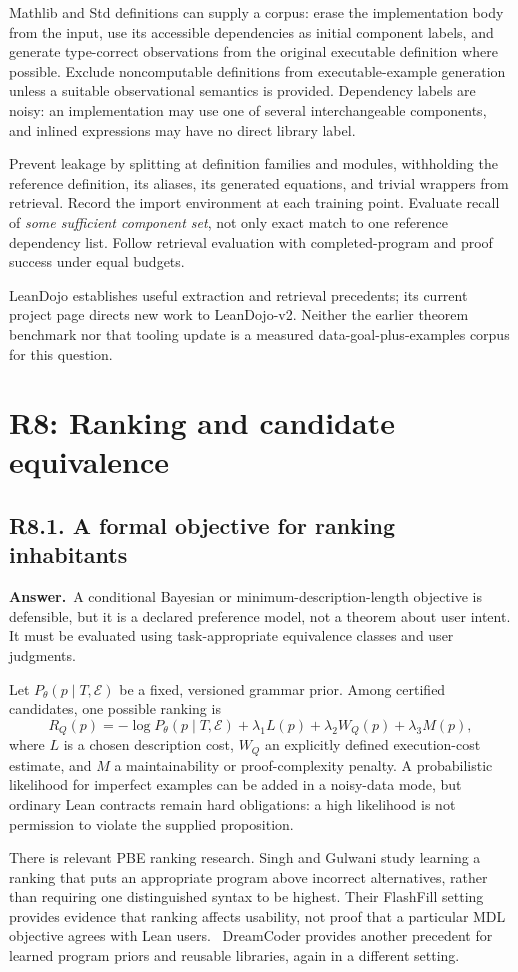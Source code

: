 \documentclass[11pt,a4paper]{article}
\newcommand{\qid}[3]{\subsection{#2. #3}\label{#1}}
\newcommand{\answer}{\noindent\textbf{Answer.}\ }
\theoremstyle{remark}
\begin{document}
Mathlib and Std definitions can supply a corpus: erase the implementation body from the input, use its accessible dependencies as initial component labels, and generate type-correct observations from the original executable definition where possible. Exclude noncomputable definitions from executable-example generation unless a suitable observational semantics is provided. Dependency labels are noisy: an implementation may use one of several interchangeable components, and inlined expressions may have no direct library label.

Prevent leakage by splitting at definition families and modules, withholding the reference definition, its aliases, its generated equations, and trivial wrappers from retrieval. Record the import environment at each training point. Evaluate recall of \emph{some sufficient component set}, not only exact match to one reference dependency list. Follow retrieval evaluation with completed-program and proof success under equal budgets.

LeanDojo establishes useful extraction and retrieval precedents; its current project page directs new work to LeanDojo-v2. Neither the earlier theorem benchmark nor that tooling update is a measured data-goal-plus-examples corpus for this question.~\cite{leandojo,leandojov2}

\section{R8: Ranking and candidate equivalence}\label{sec:r8}

\qid{q81}{R8.1}{A formal objective for ranking inhabitants}
\answer A conditional Bayesian or minimum-description-length objective is defensible, but it is a declared preference model, not a theorem about user intent. It must be evaluated using task-appropriate equivalence classes and user judgments.

Let $P_\theta(p\mid T,\mathcal E)$ be a fixed, versioned grammar prior. Among certified candidates, one possible ranking is
\[
 R_Q(p)=-\log P_\theta(p\mid T,\mathcal E)
       +\lambda_1 L(p)+\lambda_2 W_Q(p)+\lambda_3 M(p),
\]
where $L$ is a chosen description cost, $W_Q$ an explicitly defined execution-cost estimate, and $M$ a maintainability or proof-complexity penalty. A probabilistic likelihood for imperfect examples can be added in a noisy-data mode, but ordinary Lean contracts remain hard obligations: a high likelihood is not permission to violate the supplied proposition.

There is relevant PBE ranking research. Singh and Gulwani study learning a ranking that puts an appropriate program above incorrect alternatives, rather than requiring one distinguished syntax to be highest. Their FlashFill setting provides evidence that ranking affects usability, not proof that a particular MDL objective agrees with Lean users.~\cite{ranking} DreamCoder provides another precedent for learned program priors and reusable libraries, again in a different setting.~\cite{dreamcoder}
\end{document}
